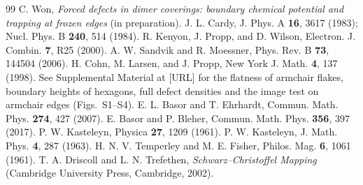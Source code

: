 \documentclass[aps,pre,twocolumn,superscriptaddress,nofootinbib,floatfix]{revtex4-2}
\begin{document}
\begin{thebibliography}{99}
 C. Won, \emph{Forced defects in dimer coverings: boundary chemical potential and trapping at frozen edges} (in preparation).
 J. L. Cardy, J. Phys. A \textbf{16}, 3617 (1983); Nucl. Phys. B \textbf{240}, 514 (1984).
 R. Kenyon, J. Propp, and D. Wilson, Electron. J. Combin. \textbf{7}, R25 (2000).
 A. W. Sandvik and R. Moessner, Phys. Rev. B \textbf{73}, 144504 (2006).
 H. Cohn, M. Larsen, and J. Propp, New York J. Math. \textbf{4}, 137 (1998).
 See Supplemental Material at [URL] for the flatness of armchair flakes, boundary heights of hexagons, full defect densities and the image test on armchair edges (Figs.~S1--S4).
 E. L. Basor and T. Ehrhardt, Commun. Math. Phys. \textbf{274}, 427 (2007).
 E. Basor and P. Bleher, Commun. Math. Phys. \textbf{356}, 397 (2017).
 P. W. Kasteleyn, Physica \textbf{27}, 1209 (1961).
 P. W. Kasteleyn, J. Math. Phys. \textbf{4}, 287 (1963).
 H. N. V. Temperley and M. E. Fisher, Philos. Mag. \textbf{6}, 1061 (1961).
 T. A. Driscoll and L. N. Trefethen, \emph{Schwarz--Christoffel Mapping} (Cambridge University Press, Cambridge, 2002).
\end{thebibliography}
\end{document}
